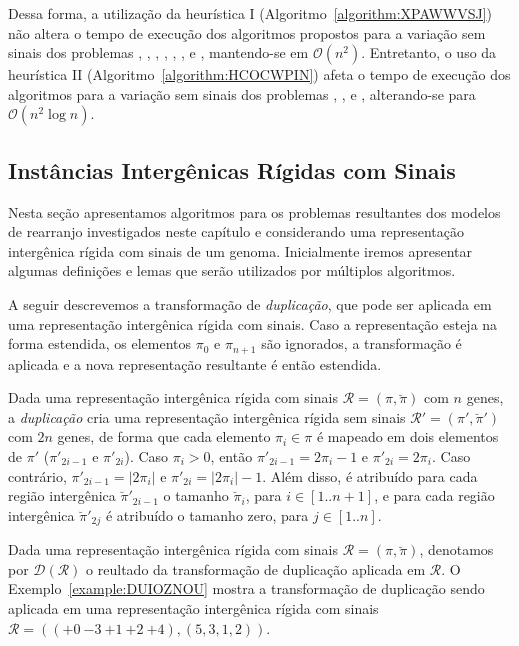 Dessa forma, a utilização da heurística I (Algoritmo~\ref{algorithm:XPAWWVSJ}) não altera o tempo de execução dos algoritmos propostos para a variação sem sinais dos problemas \SbIR{}, \SbIRI{}, \SbIRM{}, \SbIRMI{}, \SbIRT{}, \SbIRTI{}, \SbIRTM{} e \SbIRTMI{}, mantendo-se em $\mathcal{O}(n^2)$. Entretanto, o uso da heurística II (Algoritmo~\ref{algorithm:HCOCWPIN}) afeta o tempo de execução dos algoritmos para a variação sem sinais dos problemas \SbIRM{}, \SbIRMI{}, \SbIRTM{} e \SbIRTMI{}, alterando-se para $\mathcal{O}(n^2 \log n)$.

\subsection{Instâncias Intergênicas Rígidas com Sinais}

Nesta seção apresentamos algoritmos para os problemas resultantes dos modelos de rearranjo investigados neste capítulo e considerando uma representação intergênica rígida com sinais de um genoma. Inicialmente iremos apresentar algumas definições e lemas que serão utilizados por múltiplos algoritmos.

A seguir descrevemos a transformação de \emph{duplicação}, que pode ser aplicada em uma representação intergênica rígida com sinais. Caso a representação esteja na forma estendida, os elementos $\pi_0$ e $\pi_{n+1}$ são ignorados, a transformação é aplicada e a nova representação resultante é então estendida.

\begin{definition}
Dada uma representação intergênica rígida com sinais $\mathcal{R}=(\pi,\breve\pi)$ com $n$ genes, a \emph{duplicação} cria uma representação intergênica rígida sem sinais $\mathcal{R'}=(\pi',\breve\pi')$ com $2n$ genes, de forma que cada elemento $\pi_i \in \pi$ é mapeado em dois elementos de $\pi'$ ($\pi'_{2i-1}$ e $\pi'_{2i}$). Caso $\pi_i > 0$, então $\pi'_{2i-1} = 2\pi_i-1$ e $\pi'_{2i} = 2\pi_i$. Caso contrário, $\pi'_{2i-1} = |2\pi_i|$ e $\pi'_{2i} = |2\pi_i|-1$. Além disso, é atribuído para cada região intergênica $\breve\pi'_{2i-1}$ o tamanho $\breve\pi_i$, para $i\in[1..{n+1}]$, e para cada região intergênica $\breve\pi'_{2j}$ é atribuído o tamanho zero, para $j\in[1..n]$.
\end{definition}

Dada uma representação intergênica rígida com sinais $\mathcal{R}=(\pi,\breve\pi)$, denotamos por $\mathcal{D}(\mathcal{R})$ o reultado da transformação de duplicação aplicada em $\mathcal{R}$. O Exemplo~\ref{example:DUIOZNOU} mostra a transformação de duplicação sendo aplicada em uma representação intergênica rígida com sinais $\mathcal{R}=(({+0}~{-3}~{+1}~{+2}~{+4}),(5,3,1,2))$.

